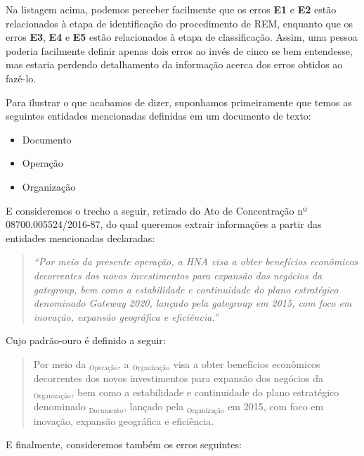 \documentclass[11pt]{report}
\newcommand{\quotes}[1]{``#1''}
\begin{document}
Na listagem acima, podemos perceber facilmente que os erros \textbf{E1} e \textbf{E2} estão relacionados à etapa de identificação do procedimento de REM, enquanto que
os erros \textbf{E3}, \textbf{E4} e \textbf{E5} estão relacionados à etapa de classificação. Assim, uma pessoa poderia facilmente definir apenas dois erros ao invés
de cinco se bem entendesse, mas estaria perdendo detalhamento da informação acerca dos erros obtidos ao fazê-lo.

Para ilustrar o que acabamos de dizer, suponhamos primeiramente que temos as seguintes entidades mencionadas definidas em um documento de texto:

\begin{itemize}
  \item Documento
  \item Operação
  \item Organização
\end{itemize}

E consideremos o trecho a seguir, retirado do Ato de Concentração nº 08700.005524/2016-87, do qual queremos extrair informações a partir das entidades mencionadas
declaradas:

\begin{quote}
  \textit{\quotes{Por meio da presente operação, a HNA visa a obter benefícios econômicos decorrentes dos novos investimentos para expansão dos negócios da gategroup,
  bem como a  estabilidade e  continuidade do plano estratégico denominado Gateway 2020, lançado pela gategroup em 2015, com foco em inovação, expansão geográfica e eficiência.}}
\end{quote}

Cujo padrão-ouro é definido a seguir:

\begin{quote}
  \begin{varwidth}{0.89\textwidth}
  Por meio da $_{\text{Operação}}$, a $_{\text{Organização}}$ visa a obter benefícios econômicos decorrentes dos novos investimentos para
  expansão dos negócios da $_{\text{Organização}}$, bem como a
  estabilidade e  continuidade do plano estratégico denominado $_{\text{Documento}}$, lançado pela $_{\text{Organização}}$ em 2015,
  com foco em inovação, expansão geográfica e eficiência.
  \end{varwidth}
\end{quote}

E finalmente, consideremos também os erros seguintes:
\end{document}

